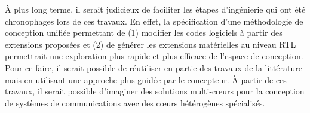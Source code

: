 \documentclass[../main.tex]{subfiles}
\begin{document}
À plus long terme, il serait judicieux de faciliter les étapes d’ingénierie qui ont été chronophages lors de ces travaux.
En effet, la spécification d’une méthodologie de conception unifiée permettant de (1) modifier les codes logiciels à partir des extensions proposées et (2) de générer les extensions matérielles au niveau RTL permettrait une exploration plus rapide et plus efficace de l’espace de conception.
Pour ce faire, il serait possible de réutiliser en partie des travaux de la littérature \cite{phd_martin} mais en utilisant une approche plus guidée par le concepteur.
À partir de ces travaux, il serait possible d’imaginer des solutions multi-cœurs pour la conception de systèmes de communications avec des cœurs hétérogènes spécialisés.
\end{document}
